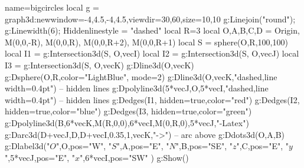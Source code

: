 \begin{luadraw}{name=bigcircles}
local g = graph3d:new{window={-4,4.5,-4,4.5},viewdir={30,60},size={10,10}}
g:Linejoin("round"); g:Linewidth(6); Hiddenlinestyle = "dashed"
local R=3
local O,A,B,C,D = Origin, M(0,0,-R), M(0,0,R), M(0,0,R+2), M(0,0,R+1)
local S = sphere(O,R,100,100) 
local I1 = g:Intersection3d(S, {O,vecI}) 
local I2 = g:Intersection3d(S, {O,vecJ})
local I3 = g:Intersection3d(S, {O,vecK})
g:Dline3d({O,vecK})
g:Dsphere(O,R,{color="LightBlue", mode=2})
g:Dline3d({O,vecK},"dashed,line width=0.4pt") -- hidden lines
g:Dpolyline3d({5*vecJ,O,5*vecI},"dashed,line width=0.4pt") -- hidden lines 
g:Dedges(I1, {hidden=true,color="red"})
g:Dedges(I2, {hidden=true,color="blue"})
g:Dedges(I3, {hidden=true,color="green"})
g:Dpolyline3d({{B,6*vecK},{M(R,0,0),6*vecI},{M(0,R,0),5*vecJ}},"-Latex")
g:Darc3d(D+vecJ,D,D+vecI,0.35,1,vecK,"->") -- arc above
g:Ddots3d({O,A,B})
g:Dlabel3d("$O$",O,{pos="W"},  "$S$",A,{pos="E"}, "$N$",B,{pos="SE"}, "$z$",C,{pos="E"}, "$y$",5*vecJ,{pos="E"}, "$x$",6*vecI,{pos="SW"} )
g:Show()
\end{luadraw}
